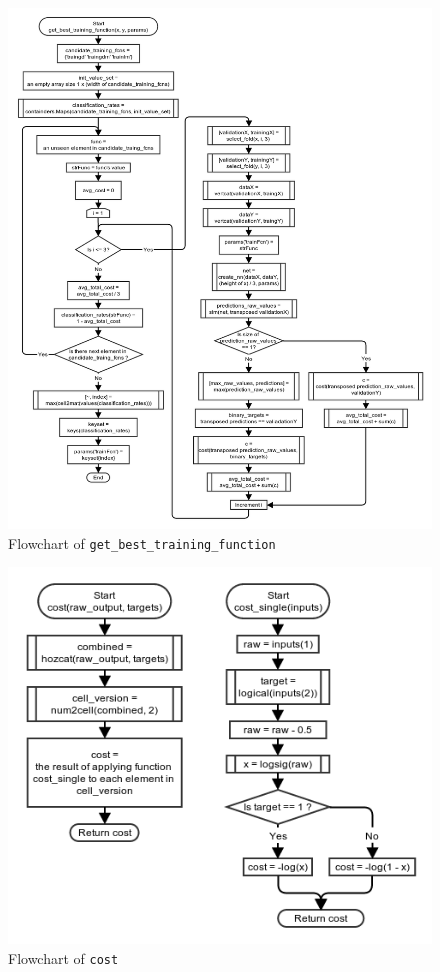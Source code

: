 \documentclass[10pt,a4paper]{article}
\begin{document}
\begin{figure}[!ht]
	\centering
	\includegraphics[height=\textheight, width=\textwidth]{images/flow_chart/get_best_training_function.png}
	\caption{Flowchart of \tt{get\_best\_training\_function}}
	\label{fig:get_best_training_function}
\end{figure}

\begin{figure}[!ht]
	\centering
	\includegraphics[scale=0.7]{images/flow_chart/cost.png}
	\caption{Flowchart of \tt{cost}}
	\label{fig:cost}
\end{figure}
\end{document}
